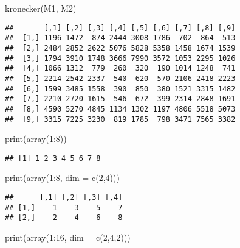 \documentclass[
]{article}
\newenvironment{Shaded}{\begin{snugshade}}{\end{snugshade}}
\newcommand{\AttributeTok}[1]{\textcolor[rgb]{0.77,0.63,0.00}{#1}}
\newcommand{\DecValTok}[1]{\textcolor[rgb]{0.00,0.00,0.81}{#1}}
\newcommand{\FunctionTok}[1]{\textcolor[rgb]{0.00,0.00,0.00}{#1}}
\newcommand{\NormalTok}[1]{#1}
\newcommand{\SpecialCharTok}[1]{\textcolor[rgb]{0.00,0.00,0.00}{#1}}
\begin{document}
\begin{Shaded}
\begin{Highlighting}[]
\FunctionTok{kronecker}\NormalTok{(M1, M2)}
\end{Highlighting}
\end{Shaded}

\begin{verbatim}
##       [,1] [,2] [,3] [,4] [,5] [,6] [,7] [,8] [,9]
##  [1,] 1196 1472  874 2444 3008 1786  702  864  513
##  [2,] 2484 2852 2622 5076 5828 5358 1458 1674 1539
##  [3,] 1794 3910 1748 3666 7990 3572 1053 2295 1026
##  [4,] 1066 1312  779  260  320  190 1014 1248  741
##  [5,] 2214 2542 2337  540  620  570 2106 2418 2223
##  [6,] 1599 3485 1558  390  850  380 1521 3315 1482
##  [7,] 2210 2720 1615  546  672  399 2314 2848 1691
##  [8,] 4590 5270 4845 1134 1302 1197 4806 5518 5073
##  [9,] 3315 7225 3230  819 1785  798 3471 7565 3382
\end{verbatim}

\begin{Shaded}
\begin{Highlighting}[]
\FunctionTok{print}\NormalTok{(}\FunctionTok{array}\NormalTok{(}\DecValTok{1}\SpecialCharTok{:}\DecValTok{8}\NormalTok{))}
\end{Highlighting}
\end{Shaded}

\begin{verbatim}
## [1] 1 2 3 4 5 6 7 8
\end{verbatim}

\begin{Shaded}
\begin{Highlighting}[]
\FunctionTok{print}\NormalTok{(}\FunctionTok{array}\NormalTok{(}\DecValTok{1}\SpecialCharTok{:}\DecValTok{8}\NormalTok{, }\AttributeTok{dim =} \FunctionTok{c}\NormalTok{(}\DecValTok{2}\NormalTok{,}\DecValTok{4}\NormalTok{)))}
\end{Highlighting}
\end{Shaded}

\begin{verbatim}
##      [,1] [,2] [,3] [,4]
## [1,]    1    3    5    7
## [2,]    2    4    6    8
\end{verbatim}

\begin{Shaded}
\begin{Highlighting}[]
\FunctionTok{print}\NormalTok{(}\FunctionTok{array}\NormalTok{(}\DecValTok{1}\SpecialCharTok{:}\DecValTok{16}\NormalTok{, }\AttributeTok{dim =} \FunctionTok{c}\NormalTok{(}\DecValTok{2}\NormalTok{,}\DecValTok{4}\NormalTok{,}\DecValTok{2}\NormalTok{))) }
\end{Highlighting}
\end{Shaded}
\end{document}
